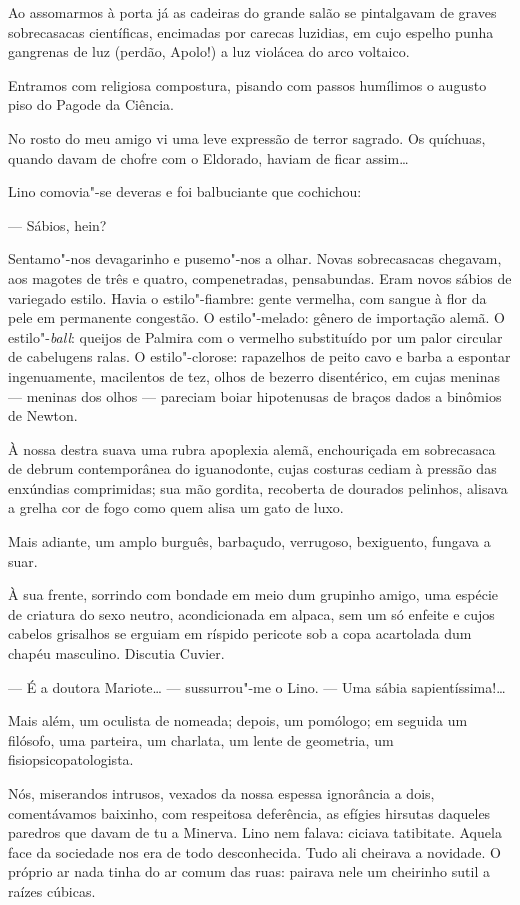 Ao assomarmos à porta já as cadeiras do grande salão se pintalgavam de
graves sobrecasacas científicas, encimadas por carecas luzidias, em cujo
espelho punha gangrenas de luz (perdão, Apolo!) a luz violácea do arco
voltaico.

Entramos com religiosa compostura, pisando com passos humílimos o
augusto piso do Pagode da Ciência.

No rosto do meu amigo vi uma leve expressão de terror sagrado. Os
quíchuas, quando davam de chofre com o Eldorado, haviam de ficar
assim\ldots{}

Lino comovia"-se deveras e foi balbuciante que cochichou:

--- Sábios, hein?

Sentamo"-nos devagarinho e pusemo"-nos a olhar. Novas sobrecasacas
chegavam, aos magotes de três e quatro, compenetradas, pensabundas. Eram
novos sábios de variegado estilo. Havia o estilo"-fiambre: gente
vermelha, com sangue à flor da pele em permanente congestão. O
estilo"-melado: gênero de importação alemã. O estilo"-\emph{ball}: queijos
de Palmira com o vermelho substituído por um palor circular de
cabelugens ralas. O estilo"-clorose: rapazelhos de peito cavo e barba a
espontar ingenuamente, macilentos de tez, olhos de bezerro disentérico,
em cujas meninas --- meninas dos olhos --- pareciam boiar hipotenusas de
braços dados a binômios de Newton.

À nossa destra suava uma rubra apoplexia alemã, enchouriçada em
sobrecasaca de debrum contemporânea do iguanodonte, cujas costuras
cediam à pressão das enxúndias comprimidas; sua mão gordita, recoberta
de dourados pelinhos, alisava a grelha cor de fogo como quem alisa um
gato de luxo.

Mais adiante, um amplo burguês, barbaçudo, verrugoso, bexiguento,
fungava a suar.

À sua frente, sorrindo com bondade em meio dum grupinho amigo, uma
espécie de criatura do sexo neutro, acondicionada em alpaca, sem um só
enfeite e cujos cabelos grisalhos se erguiam em ríspido pericote sob a
copa acartolada dum chapéu masculino. Discutia Cuvier.

--- É a doutora Mariote\ldots{} --- sussurrou"-me o Lino. --- Uma sábia
sapientíssima!\ldots{}

Mais além, um oculista de nomeada; depois, um pomólogo; em seguida um
filósofo, uma parteira, um charlata, um lente de geometria, um
fisiopsicopatologista.

Nós, miserandos intrusos, vexados da nossa espessa ignorância a dois,
comentávamos baixinho, com respeitosa deferência, as efígies hirsutas
daqueles paredros que davam de tu a Minerva. Lino nem falava: ciciava
tatibitate. Aquela face da sociedade nos era de todo desconhecida. Tudo
ali cheirava a novidade. O próprio ar nada tinha do ar comum das ruas:
pairava nele um cheirinho sutil a raízes cúbicas.

